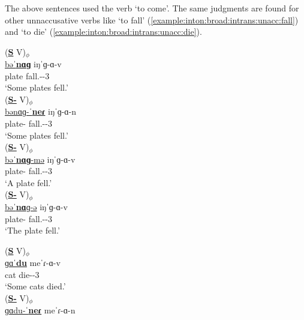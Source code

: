 The above sentences used the verb `to come'. The same judgments are found for other unnaccusative verbs like  `to fall' (\ref{example:inton:broad:intrans:unacc:fall}) and `to die' (\ref{example:inton:broad:intrans:unacc:die}). 

\begin{exe}
	\ex \begin{xlist}
		\ex  \label{example:inton:broad:intrans:unacc:fall}\begin{xlist}
			\ex \glll (\textbf{\underline{S}} V)$_\phi$ \\
			\underline{bəˈ\textbf{nɑɡ}} iŋˈɡ-ɑ-v \\
			plate fall.{\aorperf}-{\pst}-3{\sg} \\
			\trans `Some plates fell.'
			\\
			\ex \glll (\textbf{\underline{S-{\pl}}} V)$_\phi$ \\
			\underline{bənɑɡ-ˈ\textbf{neɾ}} iŋˈɡ-ɑ-n \\
			plate-{\pl} fall.{\aorperf}-{\pst}-3{\pl} \\
			\trans `Some plates fell.'
			\\
			\ex \glll (\textbf{\underline{S-{\indf}}} V)$_\phi$ \\
			\underline{bəˈ\textbf{nɑɡ}-mə} iŋˈɡ-ɑ-v \\
			plate-{\indf} fall.{\aorperf}-{\pst}-3{\sg} \\
			\trans `A plate  fell.'
			\\
			\ex \glll (\textbf{\underline{S-{}}} V)$_\phi$ \\
			\underline{bəˈ\textbf{nɑ}ɡ-ə} iŋˈɡ-ɑ-v \\
			plate-{} fall.{\aorperf}-{\pst}-3{\sg} \\
			\trans `The plate  fell.'
			\\
		\end{xlist}
		\ex  \label{example:inton:broad:intrans:unacc:die} \begin{xlist}
			\ex \glll (\textbf{\underline{S}} V)$_\phi$ \\
			\underline{ɡɑˈ\textbf{du}} meˈɾ-ɑ-v \\
			cat die-{\pst}-3{\sg} \\
			\trans `Some cats died.'
			\\\armenian{Կատու մեռաւ։}
			\ex \glll (\textbf{\underline{S-{\pl}}} V)$_\phi$ \\
			\underline{ɡɑdu-ˈ\textbf{neɾ}} meˈɾ-ɑ-n \\

\end{xlist}
\end{xlist}
\end{exe}
